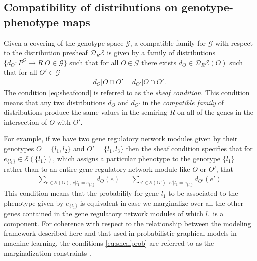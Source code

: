 \subsection{Compatibility of distributions on genotype-phenotype maps}\label{sec:compatibilityofgpms}
Given a covering of the genotype space $\mathcal{G}$, a compatible family for $\mathcal{G}$ with respect to the distribution presheaf $\mathcal{D}_R\mathcal{E}$ is given by a family of distributions $\{d_O \colon P^O \rightarrow R | O \in \mathcal{G}\}$ such that for all $O \in \mathcal{G}$ there exists $d_O \in \mathcal{D}_R\mathcal{E}(O)$ such that for all $O' \in \mathcal{G}$
\begin{eqnarray}\label{eq:sheafcond}
d_O|O \cap O' = d_{O'}|O \cap O'.
\end{eqnarray}
The condition \ref{eq:sheafcond} is referred to as the \emph{sheaf condition}. This condition means that any two distributions $d_O$ and $d_{O'}$ in the \emph{compatible family} of distributions produce the same values in the semiring $R$ on all of the genes in the intersection of $O$ with $O'$.

For example, if we have two gene regulatory network modules given by their genotypes $O = \{l_1, l_2\}$ and $O' = \{l_1, l_3\}$ then the sheaf condition specifies that for $e_{\{l_1\}} \in \mathcal{E}(\{l_1\})$, which assigns a particular phenotype to the genotype $\{l_1\}$ rather than to an entire gene regulatory network module like $O$ or $O'$, that
\begin{eqnarray}\label{eq:sheafprob}
\sum_{e \in \mathcal{E}(O),\, e|l_1=e_{\{l_1\}}} d_O(e) \,\, = \sum_{e' \in \mathcal{E}(O'),\, e'|l_1=e_{\{l_1\}}} d_{O'}(e')
\end{eqnarray}
This condition means that the probability for gene $l_1$ to be associated to the phenotype given by $e_{\{l_1\}}$ is equivalent in case we marginalize over all the other genes contained in the gene regulatory network modules of which $l_1$ is a component. For coherence with respect to the relationship between the modeling framework described here and that used in probabilistic graphical models in machine learning, the conditions \ref{eq:sheafprob} are referred to as the marginalization constraints \cite{Wainwright2007}.

